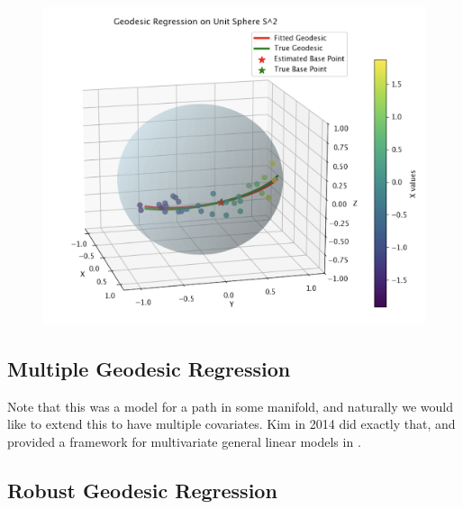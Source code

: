 \begin{example}
    \begin{figure}[H]
      \centering  
      \includegraphics[scale=0.4]{img/geodesic_sphere.png}
      \caption{} 
    \end{figure}
  \end{example}

\subsection{Multiple Geodesic Regression} 

  Note that this was a model for a path in some manifold, and naturally we would like to extend this to have multiple covariates. Kim in 2014 did exactly that, and provided a framework for multivariate general linear models in \cite{2014kim}. 

\subsection{Robust Geodesic Regression}
